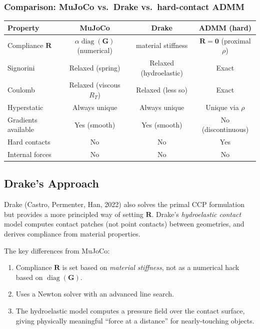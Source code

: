 \documentclass[11pt,twoside]{report}
\theoremstyle{definition}
\theoremstyle{plain}
\theoremstyle{remark}
\newcommand{\0}{\bm{0}}
\DeclareMathOperator{\diag}{diag}
\begin{document}
\subsubsection{Comparison: MuJoCo vs.\ Drake vs.\ hard-contact ADMM}

\begin{center}
\begin{tabular}{lccc}
\toprule
\textbf{Property} & \textbf{MuJoCo} & \textbf{Drake} & \textbf{ADMM (hard)}\\
\midrule
Compliance $\bm{R}$ & $\alpha\diag(\bm{G})$ (numerical) & material stiffness & $\bm{R}=\0$ (proximal $\rho$)\\
Signorini & Relaxed (spring) & Relaxed (hydroelastic) & Exact\\
Coulomb & Relaxed (viscous $R_{T}$) & Relaxed (less so) & Exact\\
Hyperstatic & Always unique & Always unique & Unique via $\rho$\\
Gradients available & Yes (smooth) & Yes (smooth) & No (discontinuous)\\
Hard contacts & No & No & Yes\\
Internal forces & No & No & No\\
\bottomrule
\end{tabular}
\end{center}

\subsection{Drake's Approach}
\label{sec:drake-contact}

Drake (Castro, Permenter, Han, 2022) also solves the primal CCP
formulation but provides a more principled way of setting $\bm{R}$.
Drake's \emph{hydroelastic contact} model computes contact patches
(not point contacts) between geometries, and derives compliance from
material properties.

The key differences from MuJoCo:
\begin{enumerate}
\item Compliance $\bm{R}$ is set based on \emph{material stiffness}, not
      as a numerical hack based on $\diag(\bm{G})$.
\item Uses a Newton solver with an advanced line search.
\item The hydroelastic model computes a pressure field over the
      contact surface, giving physically meaningful ``force at a distance''
      for nearly-touching objects.
\end{enumerate}
\end{document}

